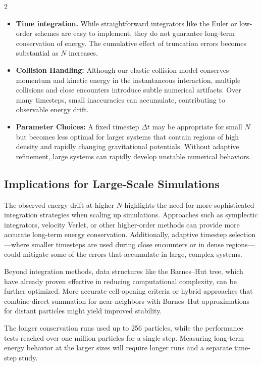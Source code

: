 \documentclass[a4paper, 12pt, oneside, onecolumn]{article}
\begin{document}
\begin{multicols}{2}
\begin{itemize}
    \item \textbf{Time integration.} While straightforward integrators like the Euler or low-order schemes are easy to implement, they do not guarantee long-term conservation of energy. The cumulative effect of truncation errors becomes substantial as $N$ increases.
    \item \textbf{Collision Handling:} Although our elastic collision model conserves momentum and kinetic energy in the instantaneous interaction, multiple collisions and close encounters introduce subtle numerical artifacts. Over many timesteps, small inaccuracies can accumulate, contributing to observable energy drift.
    \item \textbf{Parameter Choices:} A fixed timestep $\Delta t$ may be appropriate for small $N$ but becomes less optimal for larger systems that contain regions of high density and rapidly changing gravitational potentials. Without adaptive refinement, large systems can rapidly develop unstable numerical behaviors.
\end{itemize}

\subsection*{Implications for Large-Scale Simulations}

The observed energy drift at higher $N$ highlights the need for more sophisticated integration strategies when scaling up simulations. Approaches such as symplectic integrators, velocity Verlet, or other higher-order methods can provide more accurate long-term energy conservation. Additionally, adaptive timestep selection—where smaller timesteps are used during close encounters or in dense regions—could mitigate some of the errors that accumulate in large, complex systems.

Beyond integration methods, data structures like the Barnes–Hut tree, which have already proven effective in reducing computational complexity, can be further optimized. More accurate cell-opening criteria or hybrid approaches that combine direct summation for near-neighbors with Barnes–Hut approximations for distant particles might yield improved stability.

The longer conservation runs used up to 256 particles, while the performance tests reached over one million particles for a single step. Measuring long-term energy behavior at the larger sizes will require longer runs and a separate time-step study.


\end{multicols}
\end{document}
